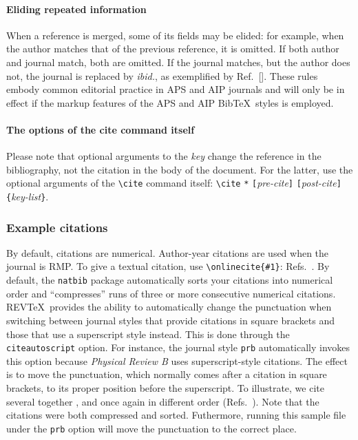\documentclass[%
reprint,
amsmath,amssymb,
aps,
]{revtex4-2}
\begin{document}
	\paragraph{Eliding repeated information}
	When a reference is merged, some of its fields may be elided: for example, 
	when the author matches that of the previous reference, it is omitted. 
	If both author and journal match, both are omitted.
	If the journal matches, but the author does not, the journal is replaced by \emph{ibid.},
	as exemplified by Ref.~[]. 
	These rules embody common editorial practice in APS and AIP journals and will only
	be in effect if the markup features of the APS and AIP Bib\TeX\ styles is employed.
	
	\paragraph{The options of the cite command itself}
	Please note that optional arguments to the \emph{key} change the reference in the bibliography, 
	not the citation in the body of the document. 
	For the latter, use the optional arguments of the \verb+\cite+ command itself:
	\verb+\cite+ \texttt{*}\allowbreak
	\texttt{[}\emph{pre-cite}\texttt{]}\allowbreak
	\texttt{[}\emph{post-cite}\texttt{]}\allowbreak
	\verb+{+\emph{key-list}\verb+}+.
	
	\subsubsection{Example citations}
	By default, citations are numerical\cite{Beutler1994}.
	Author-year citations are used when the journal is RMP. 
	To give a textual citation, use \verb+\onlinecite{#1}+: 
	Refs.~. 
	By default, the \texttt{natbib} package automatically sorts your citations into numerical order and ``compresses'' runs of three or more consecutive numerical citations.
	REV\TeX\ provides the ability to automatically change the punctuation when switching between journal styles that provide citations in square brackets and those that use a superscript style instead. This is done through the \texttt{citeautoscript} option. For instance, the journal style \texttt{prb} automatically invokes this option because \textit{Physical 
		Review B} uses superscript-style citations. The effect is to move the punctuation, which normally comes after a citation in square brackets, to its proper position before the superscript. 
	To illustrate, we cite several together 
	\cite{[See the explanation of time travel in ]feyn54,*[The classical relativistic treatment of ][ is a relative classic]epr,witten2001,Berman1983,Davies1998,Bire82}, 
	and once again in different order (Refs.~\cite{epr,feyn54,Bire82,Berman1983,witten2001,Davies1998}). 
	Note that the citations were both compressed and sorted. Futhermore, running this sample file under the \texttt{prb} option will move the punctuation to the correct place.
	
\end{document}
